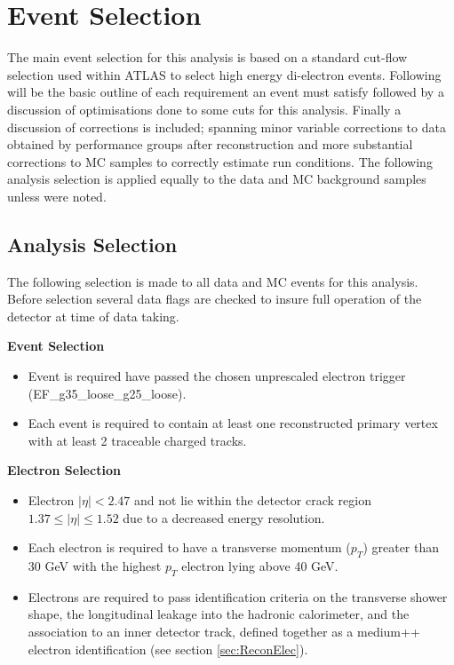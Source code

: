 \chapter{Event Selection}

The main event selection for this analysis is based on a standard cut-flow selection used within ATLAS to select high energy di-electron events. Following will be the basic outline of each requirement an event must satisfy followed by a discussion of optimisations done to some cuts for this analysis. Finally a discussion of corrections is included; spanning minor variable corrections to data obtained by performance groups after reconstruction and more substantial corrections to MC samples to correctly estimate run conditions.
The following analysis selection is applied equally to the data and MC background samples unless were noted.


\section{Analysis Selection}

The following selection is made to all data and MC events for this analysis. Before selection several data flags are checked to insure full operation of the detector at time of data taking. 

{\bf Event Selection}
\begin{itemize}
\item Event is required have passed the chosen unprescaled electron trigger (EF\_g35\_loose\_g25\_loose).
\item Each event is required to contain at least one reconstructed primary vertex with at least 2 traceable charged tracks.
\end{itemize}


{\bf Electron Selection}
\begin{itemize}
\item Electron $|\eta| < 2.47$ and not lie within the detector crack region $1.37 \leq |\eta| \leq 1.52$ due to a decreased energy resolution.
\item Each electron is required to have a transverse momentum ($p_{T}$) greater than 30 GeV with the highest $p_{T}$ electron lying above 40 GeV.
\item Electrons are required to pass identification criteria on the transverse shower shape, the longitudinal leakage into the hadronic calorimeter, and the association to an inner detector track, defined together as a medium++ electron identification (see section \ref{sec:ReconElec}).
\end{itemize}


